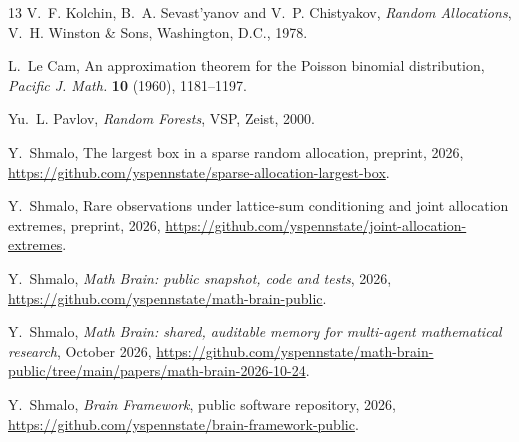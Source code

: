 \documentclass[11pt]{amsart}
\theoremstyle{definition}
\theoremstyle{remark}
\numberwithin{equation}{section}
\begin{document}
\begin{thebibliography}{13}
V.~F. Kolchin, B.~A. Sevast'yanov and V.~P. Chistyakov, \emph{Random Allocations}, V.~H. Winston \& Sons, Washington, D.C., 1978.

L.~Le Cam, An approximation theorem for the Poisson binomial distribution, \emph{Pacific J. Math.} \textbf{10} (1960), 1181--1197.

Yu.~L. Pavlov, \emph{Random Forests}, VSP, Zeist, 2000.

Y.~Shmalo, The largest box in a sparse random allocation, preprint, 2026, \url{https://github.com/yspennstate/sparse-allocation-largest-box}.

Y.~Shmalo, Rare observations under lattice-sum conditioning and joint allocation extremes, preprint, 2026, \url{https://github.com/yspennstate/joint-allocation-extremes}.

 Y.~Shmalo, \emph{Math Brain: public snapshot, code and tests}, 2026, \url{https://github.com/yspennstate/math-brain-public}.

 Y.~Shmalo, \emph{Math Brain: shared, auditable memory for multi-agent mathematical research}, October 2026, \url{https://github.com/yspennstate/math-brain-public/tree/main/papers/math-brain-2026-10-24}.

 Y.~Shmalo, \emph{Brain Framework}, public software repository, 2026, \url{https://github.com/yspennstate/brain-framework-public}.

\end{thebibliography}
\end{document}
